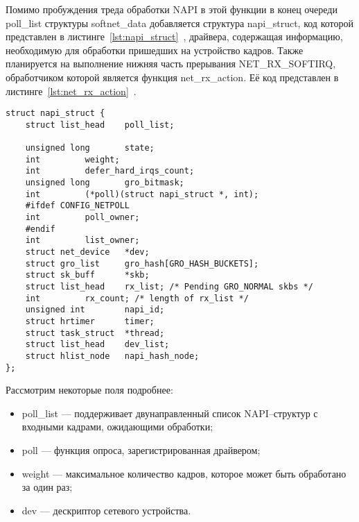 Помимо пробуждения треда обработки NAPI в этой функции в конец очереди poll\_list структуры  softnet\_data добавляется структура  napi\_struct, код которой представлен в листинге~\ref{lst:napi_struct}~\cite{napi_struct}, драйвера, содержащая информацию, необходимую для обработки пришедших на устройство кадров. Также планируется на выполнение нижняя часть прерывания NET\_RX\_SOFTIRQ, обработчиком  которой является функция net\_rx\_action. Её код представлен в листинге~\ref{lst:net_rx_action}~\cite{net_rx_action}.

\begin{center}
	\captionsetup{justification=raggedright,singlelinecheck=off}
	\begin{lstlisting}[label=lst:napi_struct,caption=Структура napi\_struct,showstringspaces=false]
struct napi_struct {
	struct list_head	poll_list;
	
	unsigned long		state;
	int			weight;
	int			defer_hard_irqs_count;
	unsigned long		gro_bitmask;
	int			(*poll)(struct napi_struct *, int);
	#ifdef CONFIG_NETPOLL
	int			poll_owner;
	#endif
	int			list_owner;
	struct net_device	*dev;
	struct gro_list		gro_hash[GRO_HASH_BUCKETS];
	struct sk_buff		*skb;
	struct list_head	rx_list; /* Pending GRO_NORMAL skbs */
	int			rx_count; /* length of rx_list */
	unsigned int		napi_id;
	struct hrtimer		timer;
	struct task_struct	*thread;
	struct list_head	dev_list;
	struct hlist_node	napi_hash_node;
};
	\end{lstlisting}
\end{center}
\FloatBarrier

Рассмотрим некоторые поля подробнее:
\begin{itemize}[label=---]
	\item poll\_list --- поддерживает двунаправленный список NAPI--структур с входными кадрами, ожидающими обработки;
	\item poll --- функция опроса, зарегистрированная драйвером; 
	\item weight --- максимальное количество кадров, которое может быть обработано за один раз;
	\item dev --- дескриптор сетевого устройства.
\end{itemize}

